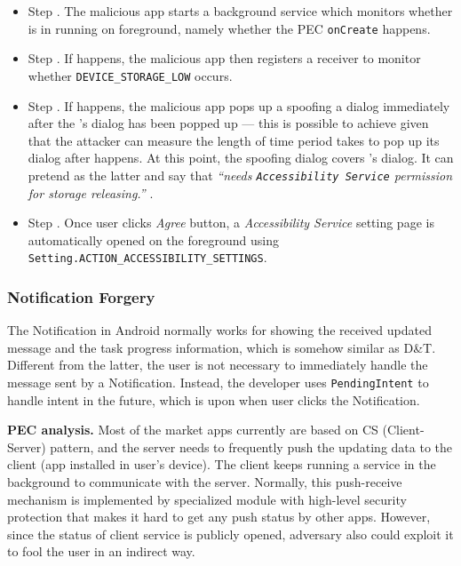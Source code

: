 \begin{itemize}
    \item Step . The malicious app starts a background service which monitors whether \du is in running on foreground, namely whether the PEC \texttt{onCreate} happens. 
    \item Step . If  happens, the malicious app then registers a receiver to monitor whether \texttt{DEVICE\_STORAGE\_LOW} occurs.  
    \item Step . If  happens, the malicious app pops up a spoofing a dialog immediately after the \du's dialog has been popped up --- this is possible to achieve given that the attacker can measure the length of time period \du takes to pop up its dialog after  happens. 
    At this point, the spoofing dialog covers \du's dialog.
    It can pretend as the latter and say that \emph{``\du needs \texttt{Accessibility Service} permission for storage releasing.''} . 
    \item Step .  Once user clicks \textit{Agree} button, a \textit{Accessibility Service} setting page is automatically opened on the foreground using \texttt{Setting.ACTION\_ACCESSIBILITY\_SETTINGS}. 
\end{itemize}

\subsubsection{Notification Forgery}
The Notification in Android normally works for showing the received updated message and the task progress information, which is somehow similar as D\&T. Different from the latter, the user is not necessary to immediately handle the message sent by a Notification. Instead, the developer uses \texttt{PendingIntent} to handle intent in the future, which is upon when user clicks the Notification. 



\textbf{PEC analysis.}
Most of the market apps currently are based on CS (Client-Server) pattern, and the server needs to frequently push the updating data to the client (app installed in user's device). The client keeps running a service in the background to communicate with the server. Normally, this push-receive mechanism is implemented by specialized module with high-level security protection that makes it hard to get any push status by other apps. However, since the status of client service is publicly opened, adversary also could exploit it to fool the user in an indirect way. 

